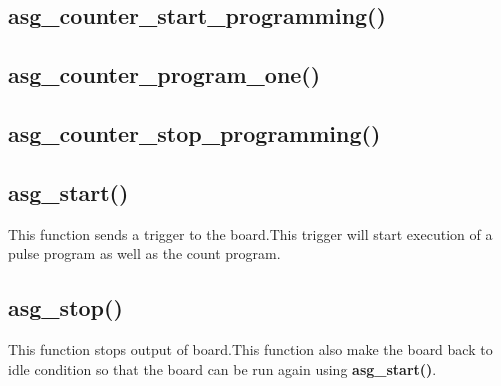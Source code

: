 \subsection{asg\_counter\_start\_programming()}
\subsection{asg\_counter\_program\_one()}
\subsection{asg\_counter\_stop\_programming()}


\subsection{asg\_start()}
This function sends a trigger to the board.This trigger will start execution of a pulse program as well as the count program.
\subsection{asg\_stop()}
This function stops output of board.This function also make the board back to idle condition so that the board can be run again using \textbf{asg\_start()}.
